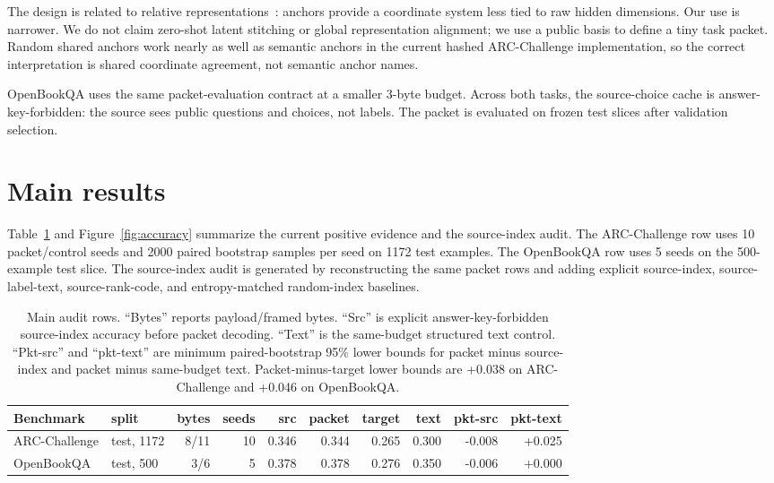 \documentclass{article}
\newcommand{\arc}{ARC-Challenge}
\newcommand{\obqa}{OpenBookQA}
\begin{document}
The design is related to relative representations~\citep{Moschella2023Relative}: anchors provide a coordinate system less tied to raw hidden dimensions. Our use is narrower. We do not claim zero-shot latent stitching or global representation alignment; we use a public basis to define a tiny task packet. Random shared anchors work nearly as well as semantic anchors in the current hashed \arc{} implementation, so the correct interpretation is shared coordinate agreement, not semantic anchor names.

\obqa{} uses the same packet-evaluation contract at a smaller 3-byte budget. Across both tasks, the source-choice cache is answer-key-forbidden: the source sees public questions and choices, not labels. The packet is evaluated on frozen test slices after validation selection.

\section{Main results}

Table~\ref{tab:main} and Figure~\ref{fig:accuracy} summarize the current positive evidence and the source-index audit. The \arc{} row uses 10 packet/control seeds and 2000 paired bootstrap samples per seed on 1172 test examples. The \obqa{} row uses 5 seeds on the 500-example test slice. The source-index audit is generated by reconstructing the same packet rows and adding explicit source-index, source-label-text, source-rank-code, and entropy-matched random-index baselines.

\begin{table}[t]
  \centering
  \small
  \setlength{\tabcolsep}{3.8pt}
\begin{tabular}{llrrrrrrrr}
    \toprule
    Benchmark & split & bytes & seeds & src & packet & target & text & pkt-src & pkt-text \\
    \midrule
    \arc{} & test, 1172 & 8/11 & 10 & 0.346 & 0.344 & 0.265 & 0.300 & -0.008 & +0.025 \\
    \obqa{} & test, 500 & 3/6 & 5 & 0.378 & 0.378 & 0.276 & 0.350 & -0.006 & +0.000 \\
    \bottomrule
  \end{tabular}
  \caption{Main audit rows. ``Bytes'' reports payload/framed bytes. ``Src'' is explicit answer-key-forbidden source-index accuracy before packet decoding. ``Text'' is the same-budget structured text control. ``Pkt-src'' and ``pkt-text'' are minimum paired-bootstrap 95\% lower bounds for packet minus source-index and packet minus same-budget text. Packet-minus-target lower bounds are +0.038 on \arc{} and +0.046 on \obqa{}.}
  \label{tab:main}
\end{table}
\end{document}
